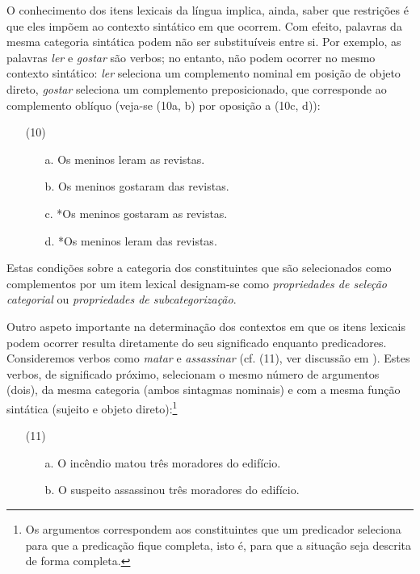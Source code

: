 \documentclass[output=paper,colorlinks,citecolor=brown,booklanguage=portuguese]{langscibook}
\begin{document}
O conhecimento dos itens lexicais da língua implica, ainda, saber que restrições é que eles impõem ao contexto sintático em que ocorrem. Com efeito, palavras da mesma categoria sintática podem não ser substituíveis entre si. Por exemplo, as palavras \emph{ler} e \emph{gostar} são verbos; no entanto, não podem ocorrer no mesmo contexto sintático: \emph{ler} seleciona um complemento nominal em posição de objeto direto, \emph{gostar} seleciona um complemento preposicionado, que corresponde ao complemento oblíquo (veja-se (10a, b) por oposição a (10c, d)):

\begin{enumerate}[align=left]
    \item [(10)]
    \begin{enumerate}
        \item [a.] Os meninos leram as revistas.
	\item[b.] Os meninos gostaram das revistas.
	\item[c.] *Os meninos gostaram as revistas.
	\item[d.] *Os meninos leram das revistas.
    \end{enumerate}
\end{enumerate}

Estas condições sobre a categoria dos constituintes que são selecionados como complementos por um item lexical designam-se como \emph{propriedades de seleção categorial} ou \emph{propriedades de subcategorização}.

Outro aspeto importante na determinação dos contextos em que os itens lexicais podem ocorrer resulta diretamente do seu significado enquanto predicadores. Consideremos verbos como \emph{matar} e \emph{assassinar} (cf. (11), ver discussão em \citealp[71-72]{Duarte2000}). Estes verbos, de significado próximo, selecionam o mesmo número de argumentos (dois), da mesma categoria (ambos sintagmas nominais) e com a mesma função sintática (sujeito e objeto direto):\footnote{Os argumentos correspondem aos constituintes que um predicador seleciona para que a predicação fique completa, isto é, para que a situação seja descrita de forma completa.} 

\begin{enumerate}[align=left]
    \item [(11)]
    \begin{enumerate}
        \item [a.] O incêndio matou três moradores do edifício.
\item	[b.] O suspeito assassinou três moradores do edifício.
    \end{enumerate}
\end{enumerate}
\end{document}
